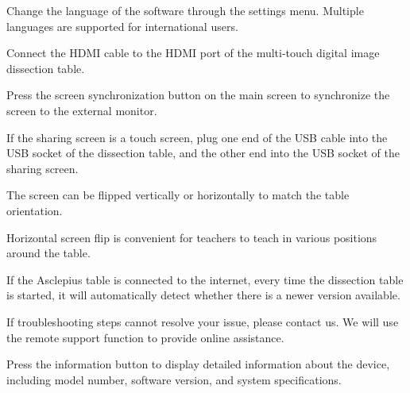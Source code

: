 \documentclass[11pt,a4paper]{article}
\begin{document}


Change the language of the software through the settings menu. Multiple languages
are supported for international users.



\begin{tbkSteps}
  \item Connect the HDMI cable to the HDMI port of the multi-touch digital
        image dissection table.
  \item Press the screen synchronization button on the main screen to
        synchronize the screen to the external monitor.
  \item If the sharing screen is a touch screen, plug one end of the USB
        cable into the USB socket of the dissection table, and the other
        end into the USB socket of the sharing screen.
\end{tbkSteps}


The screen can be flipped vertically or horizontally to match the table orientation.


Horizontal screen flip is convenient for teachers to teach in various positions
around the table.


If the Asclepius table is connected to the internet, every time the dissection
table is started, it will automatically detect whether there is a newer version
available.



If troubleshooting steps cannot resolve your issue, please contact us.
We will use the remote support function to provide online assistance.


Press the information button  to display detailed information about
the device, including model number, software version, and system specifications.

\end{document}
